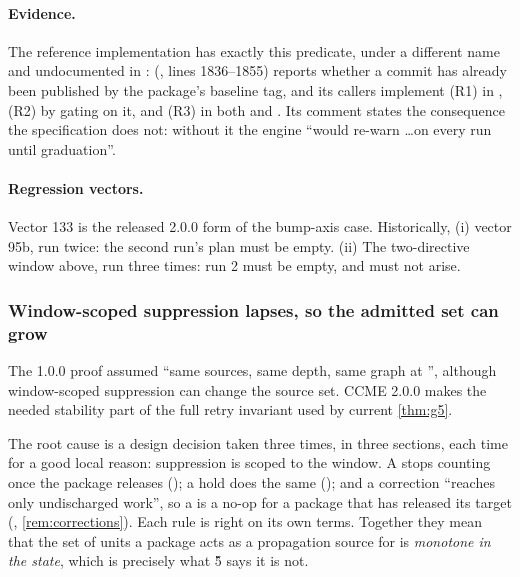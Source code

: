 \paragraph{Evidence.} The reference implementation has exactly this predicate,
under a different name and undocumented in \SPEC{}:
 (,
lines 1836--1855) reports whether a commit has already been published by the
package's baseline tag, and its callers implement (R1) in
, (R2) by gating  on it, and (R3) in both
 and . Its comment states the
consequence the specification does not: without it the engine ``would re-warn
\dots on every run until graduation''.

\paragraph{Regression vectors.} Vector 133 is the released 2.0.0 form of the bump-axis case. Historically, (i) vector 95b, run twice: the second run's plan
must be empty. (ii) The two-directive window above, run three times: run 2 must
be empty, and  must not arise.

\subsubsection{Window-scoped suppression lapses, so the admitted set can grow}

\begin{obligation}
\label{ob:g5}
The 1.0.0 proof assumed ``same sources, same depth, same graph at \Head{}'', although window-scoped suppression can change the source set. CCME 2.0.0 makes the needed stability part of the full retry invariant used by current \cref{thm:g5}.
\end{obligation}

The root cause is a design decision taken three times, in three sections, each
time for a good local reason: suppression is scoped to the window. A
 stops counting once the package releases (); a hold
does the same (); and a correction ``reaches only undischarged
work'', so a  is a no-op for a package that has released its
target (, \cref{rem:corrections}). Each rule is right on its own
terms. Together they mean that the set of units a package acts as a propagation
source for is \emph{monotone in the state}, which is precisely what \G{5} says
it is not.

